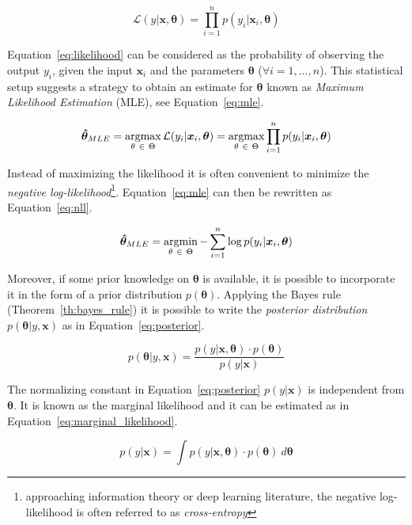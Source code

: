 \begin{equation} \label{eq:likelihood}
	\mathcal{L}(y|\bm{x}, \bm{\theta}) = \prod_{i=1}^{n} p(y_i | \bm{x}_i , \bm{\theta})
\end{equation}

Equation~\eqref{eq:likelihood} can be considered as the probability of observing the output $y_i$, given the input $\bm{x}_i$ and the parameters $\bm{\theta}$ ($\forall i=1,\dots,n$).
This statistical setup suggests a strategy to obtain an estimate for $\bm{\theta}$ known as \textit{Maximum Likelihood Estimation} (MLE), see Equation~\eqref{eq:mle}.

\begin{equation} \label{eq:mle}
	\bm{\hat \theta}_{MLE} =\mathop{\mathrm{argmax}}\limits_{\theta~\in~\Theta}\mathcal{L}(y_i|\bm{x}_i, \bm{\theta}) = \mathop{\mathrm{argmax}}\limits_{\theta~\in~\Theta} \prod_{i=1}^{n} p(y_i | \bm{x}_i, \bm{\theta})
\end{equation}

Instead of maximizing the likelihood it is often convenient to minimize the \textit{negative log-likelihood}\footnote{approaching information theory or deep learning literature, the negative log-likelihood is often referred to as \textit{cross-entropy}}. Equation~\eqref{eq:mle} can then be rewritten as Equation~\eqref{eq:nll}.

\begin{equation} \label{eq:nll}
	\bm{\hat \theta}_{MLE} = \mathop{\mathrm{argmin}}\limits_{\theta~\in~\Theta} - \sum_{i=1}^n \log p(y_i | \bm{x}_i, \bm{\theta})
\end{equation}

Moreover, if some prior knowledge on $\bm{\theta}$ is available, it is possible to incorporate it in the form of a prior distribution $p(\bm{\theta})$. Applying the Bayes rule (Theorem~\ref{th:bayes_rule}) it is possible to write the \textit{posterior distribution} $p(\bm{\theta}|y,\bm{x})$ as in Equation~\eqref{eq:posterior}.

\begin{equation} \label{eq:posterior}
	p(\bm{\theta}|y,\bm{x}) = \frac{p(y|\bm{x}, \bm{\theta}) \cdot p(\bm{\theta})}{p(y|\bm{x})}
\end{equation}

The normalizing constant in Equation~\eqref{eq:posterior} $p(y|\bm{x})$ is independent from $\bm{\theta}$. It is known as the marginal likelihood and it can be estimated as in Equation~\eqref{eq:marginal_likelihood}.

\begin{equation} \label{eq:marginal_likelihood}
	p(y|\bm{x}) = \int p(y|\bm{x}, \bm{\theta}) \cdot p(\bm{\theta})~d\bm{\theta}
\end{equation}

